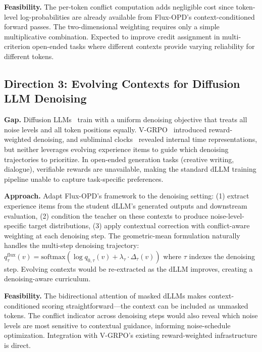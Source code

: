 \documentclass[11pt,a4paper]{article}
\begin{document}
\textbf{Feasibility.} The per-token conflict computation adds negligible cost since token-level log-probabilities are already available from Flux-OPD's context-conditioned forward passes. The two-dimensional weighting requires only a simple multiplicative combination. Expected to improve credit assignment in multi-criterion open-ended tasks where different contexts provide varying reliability for different tokens.

\subsection{Direction 3: Evolving Contexts for Diffusion LLM Denoising}

\textbf{Gap.} Diffusion LLMs~\cite{sumi2026} train with a uniform denoising objective that treats all noise levels and all token positions equally. V-GRPO~\cite{vgrpo2026} introduced reward-weighted denoising, and subliminal clocks~\cite{subliminalclocks2026} revealed internal time representations, but neither leverages evolving experience items to guide which denoising trajectories to prioritize. In open-ended generation tasks (creative writing, dialogue), verifiable rewards are unavailable, making the standard dLLM training pipeline unable to capture task-specific preferences.

\textbf{Approach.} Adapt Flux-OPD's framework to the denoising setting: (1) extract experience items from the student dLLM's generated outputs and downstream evaluation, (2) condition the teacher on these contexts to produce noise-level-specific target distributions, (3) apply contextual correction with conflict-aware weighting at each denoising step. The geometric-mean formulation naturally handles the multi-step denoising trajectory: $q^{\mathrm{flux}}_\tau(v) = \mathrm{softmax}(\log q_{0,\tau}(v) + \lambda_\tau \cdot \Delta_\tau(v))$ where $\tau$ indexes the denoising step. Evolving contexts would be re-extracted as the dLLM improves, creating a denoising-aware curriculum.

\textbf{Feasibility.} The bidirectional attention of masked dLLMs makes context-conditioned scoring straightforward---the context can be included as unmasked tokens. The conflict indicator across denoising steps would also reveal which noise levels are most sensitive to contextual guidance, informing noise-schedule optimization. Integration with V-GRPO's existing reward-weighted infrastructure is direct.
\end{document}
